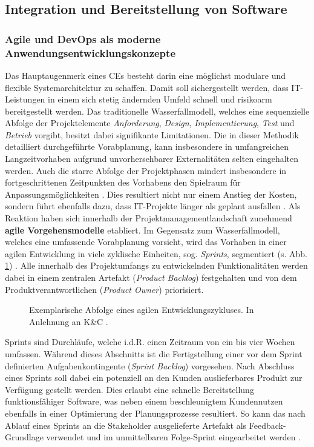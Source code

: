 \subsection{Integration und Bereitstellung von Software}
\subsubsection{Agile und DevOps als moderne Anwendungsentwicklungskonzepte}
Das Hauptaugenmerk eines CEs besteht darin eine möglichst modulare und flexible Systemarchitektur zu schaffen. Damit soll sichergestellt werden, dass IT-Leistungen in einem sich stetig ändernden Umfeld schnell und risikoarm bereitgestellt werden. Das traditionelle Wasserfallmodell, welches eine sequenzielle Abfolge der Projektelemente \textit{Anforderung}, \textit{Design}, \textit{Implementierung}, \textit{Test} und \textit{Betrieb} vorgibt, besitzt dabei signifikante Limitationen. Die in dieser Methodik detailliert durchgeführte Vorabplanung, kann insbesondere in umfangreichen Langzeitvorhaben aufgrund unvorhersehbarer Externalitäten selten eingehalten werden. Auch die starre Abfolge der Projektphasen mindert insbesondere in fortgeschrittenen Zeitpunkten des Vorhabens den Spielraum für Anpassungsmöglichkeiten \cite[5]{Vivenzio.2013}. Dies resultiert nicht nur einem Anstieg der Kosten, sondern führt ebenfalls dazu, dass IT-Projekte länger als geplant ausfallen \cite[41]{Vieweg.2015}. Als Reaktion haben sich innerhalb der Projektmanagementlandschaft zunehmend \textbf{agile Vorgehensmodelle} etabliert.
Im Gegensatz zum Wasserfallmodell, welches eine umfassende Vorabplanung vorsieht, wird das Vorhaben in einer agilen Entwicklung in viele zyklische Einheiten, sog. \textit{Sprints}, segmentiert (s. Abb. \ref*{fig:Agile_Cycle}) \cite[87]{Goll.2015}. Alle innerhalb des Projektumfangs zu entwickelnden Funktionalitäten werden dabei in einem zentralen Artefakt (\textit{Product Backlog}) festgehalten und von dem Produktverantwortlichen (\textit{Product Owner}) priorisiert. 
\begin{center}
	\begin{figure}[H]
		\centering
		\caption[Exemplarische Abfolge eines agilen Entwicklungszykluses]{Exemplarische Abfolge eines agilen Entwicklungszykluses. In Anlehnung an K\&C \cite{K&C.2021}.}
		\label{fig:Agile_Cycle}
	\end{figure}	
\end{center}
\vspace*{-15mm}
Sprints sind Durchläufe, welche i.d.R. einen Zeitraum von ein bis vier Wochen umfassen. Während dieses Abschnitts ist die Fertigstellung einer vor dem Sprint definierten Aufgabenkontingente (\textit{Sprint Backlog}) vorgesehen. Nach Abschluss eines Sprints soll dabei ein potenziell an den Kunden auslieferbares Produkt zur Verfügung gestellt werden. Dies erlaubt eine schnelle Bereitstellung funktionsfähiger Software, was neben einem beschleunigtem Kundennutzen ebenfalls in einer Optimierung der Planungsprozesse resultiert. So kann das nach Ablauf eines Sprints an die Stakeholder ausgelieferte Artefakt als Feedback-Grundlage verwendet und im unmittelbaren Folge-Sprint eingearbeitet werden \cite[39]{K&C.2021}.
